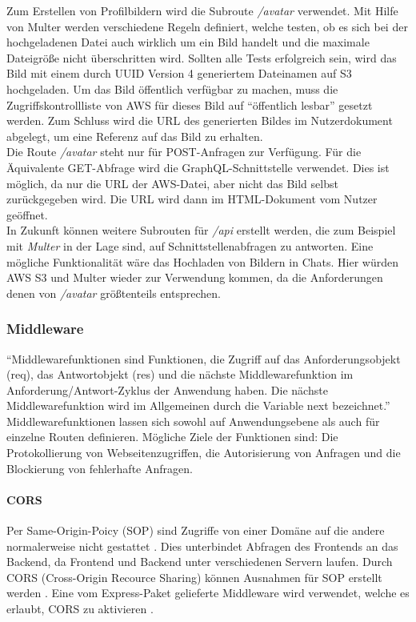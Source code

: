 Zum Erstellen von Profilbildern wird die Subroute \textit{/avatar} verwendet.
Mit Hilfe von Multer werden verschiedene Regeln definiert, welche testen, ob es sich bei der hochgeladenen Datei auch wirklich um ein Bild handelt und die maximale Dateigröße nicht überschritten wird.
Sollten alle Tests erfolgreich sein, wird das Bild mit einem durch UUID Version 4 generiertem Dateinamen auf S3 hochgeladen.
Um das Bild öffentlich verfügbar zu machen, muss die Zugriffskontrollliste von AWS für dieses Bild auf \enquote{öffentlich lesbar} gesetzt werden.
Zum Schluss wird die URL des generierten Bildes im Nutzerdokument abgelegt, um eine Referenz auf das Bild zu erhalten.\\

Die Route \textit{/avatar} steht nur für POST-Anfragen zur Verfügung.
Für die Äquivalente GET-Abfrage wird die GraphQL-Schnittstelle verwendet.
Dies ist möglich, da nur die URL der AWS-Datei, aber nicht das Bild selbst zurückgegeben wird.
Die URL wird dann im HTML-Dokument vom Nutzer geöffnet.\\

In Zukunft können weitere Subrouten für \textit{/api} erstellt werden, die zum Beispiel mit \textit{Multer} in der Lage sind, auf Schnittstellenabfragen zu antworten.
Eine mögliche Funktionalität wäre das Hochladen von Bildern in Chats.
Hier würden AWS S3 und Multer wieder zur Verwendung kommen, da die Anforderungen denen von \textit{/avatar} größtenteils entsprechen.

\subsubsection{Middleware}
\enquote{Middlewarefunktionen sind Funktionen, die Zugriff auf das Anforderungsobjekt (req), das Antwortobjekt (res) und die nächste Middlewarefunktion im Anforderung/Antwort-Zyklus der Anwendung haben. Die nächste Middlewarefunktion wird im Allgemeinen durch die Variable next bezeichnet.}\cite{be:expressMiddlewareQuote}
Middlewarefunktionen lassen sich sowohl auf Anwendungsebene als auch für einzelne Routen definieren.
Mögliche Ziele der Funktionen sind: Die Protokollierung von Webseitenzugriffen, die Autorisierung von Anfragen und die Blockierung von fehlerhafte Anfragen.

\paragraph{CORS\\}
Per Same-Origin-Poicy (SOP) sind Zugriffe von einer Domäne auf die andere normalerweise nicht gestattet \cite{be:mdnSop}.
Dies unterbindet Abfragen des Frontends an das Backend, da Frontend und Backend unter verschiedenen Servern laufen.
Durch CORS (Cross-Origin Recource Sharing) können Ausnahmen für SOP erstellt werden \cite{be:mdnCors}.
Eine vom Express-Paket gelieferte Middleware wird verwendet, welche es erlaubt, CORS zu aktivieren \cite{be:expressMiddlewareCors}.

